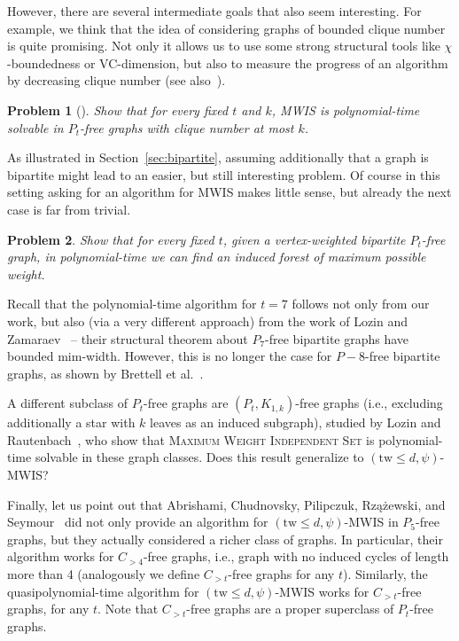 \documentclass[11pt,a4paper]{article}
\newtheorem{problem}{Problem}[section]
\theoremstyle{definition}
\begin{document}
However, there are several intermediate goals that also seem interesting.
For example, we think that the idea of considering graphs of bounded clique number is quite promising.
Not only it allows us to use some strong structural tools like $\chi$-boundedness or VC-dimension, but also to measure the progress of an algorithm by decreasing clique number (see also~\cite{DBLP:journals/siamdm/ChudnovskyKPRS21,DBLP:journals/ipl/BrettellHMP22}).


\begin{problem}[{\cite[Problem 9.2]{DBLP:journals/siamdm/ChudnovskyKPRS21}}]
Show that for every fixed $t$ and $k$, MWIS is polynomial-time solvable in $P_t$-free graphs with clique number at most $k$.
\end{problem}

As illustrated in Section~\ref{sec:bipartite}, assuming additionally that a graph is bipartite might lead to an easier, but still interesting problem.
Of course in this setting asking for an algorithm for MWIS makes little sense, but already the next case is far from trivial.

\begin{problem}
Show that for every fixed $t$, given a vertex-weighted bipartite $P_t$-free graph, in polynomial-time we can find an induced forest of maximum possible weight.
\end{problem}


Recall that the polynomial-time algorithm for $t=7$ follows not only from our work, but also (via a very different approach) from the work of Lozin and Zamaraev~\cite{DBLP:journals/ejc/LozinZ17} -- their structural theorem about $P_7$-free bipartite graphs have bounded mim-width. However, this is no longer the case for $P-8$-free bipartite graphs, as shown by Brettell et al.~\cite{DBLP:journals/jgt/BrettellHMPP22}.

A different subclass of $P_t$-free graphs are $(P_t,K_{1,k})$-free graphs
(i.e., excluding additionally a star with $k$ leaves as an induced subgraph),
studied by Lozin and Rautenbach~\cite{DBLP:journals/ipl/LozinR03},
who show that \textsc{Maximum Weight Independent Set}
is polynomial-time solvable in these graph classes.
Does this result generalize to $(\mathrm{tw} \leq d,\psi)$-MWIS?

Finally, let us point out that Abrishami, Chudnovsky, Pilipczuk, Rzążewski, and Seymour~\cite{Tara} did not only provide an algorithm for $(\mathrm{tw} \leq d,\psi)$-MWIS in $P_5$-free graphs, but they actually considered a richer class of graphs. In particular, their algorithm works for $C_{>4}$-free graphs, i.e., graph with no induced cycles of length more than 4 (analogously we define $C_{>t}$-free graphs for any $t$).
Similarly, the quasipolynomial-time algorithm for $(\mathrm{tw} \leq d,\psi)$-MWIS works for $C_{>t}$-free graphs, for any $t$.
Note that $C_{>t}$-free graphs are a proper superclass of $P_t$-free graphs.
\end{document}
